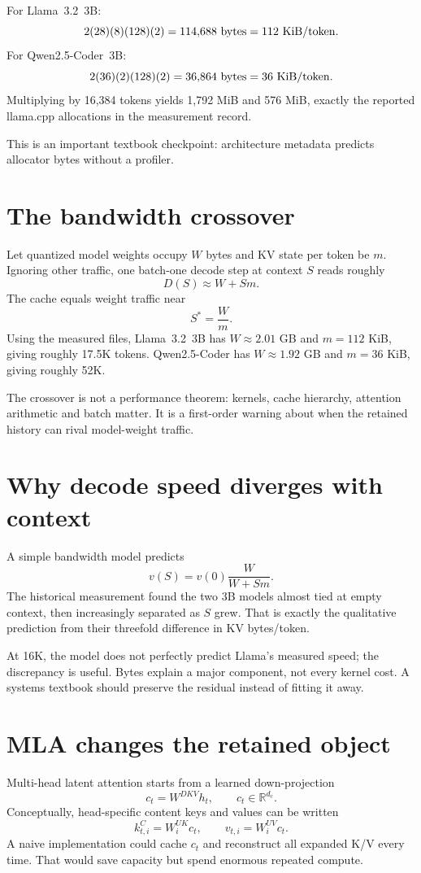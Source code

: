 For Llama~3.2~3B:
\[
2(28)(8)(128)(2)=114{,}688\ {\rm bytes}=112\ {\rm KiB/token}.
\]
For Qwen2.5-Coder~3B:
\[
2(36)(2)(128)(2)=36{,}864\ {\rm bytes}=36\ {\rm KiB/token}.
\]
Multiplying by 16,384 tokens yields 1,792 MiB and 576 MiB, exactly the reported
llama.cpp allocations in the measurement record.

This is an important textbook checkpoint: architecture metadata predicts allocator
bytes without a profiler.

\section{The bandwidth crossover}

Let quantized model weights occupy $W$ bytes and KV state per token be $m$. Ignoring
other traffic, one batch-one decode step at context $S$ reads roughly
\[
D(S)\approx W+Sm.
\]
The cache equals weight traffic near
\[
S^*=\frac{W}{m}.
\]
Using the measured files, Llama~3.2~3B has $W\approx2.01$ GB and
$m=112$ KiB, giving roughly 17.5K tokens. Qwen2.5-Coder has $W\approx1.92$ GB and
$m=36$ KiB, giving roughly 52K.

The crossover is not a performance theorem: kernels, cache hierarchy, attention
arithmetic and batch matter. It is a first-order warning about when the retained
history can rival model-weight traffic.

\section{Why decode speed diverges with context}

A simple bandwidth model predicts
\[
v(S)=v(0)\frac{W}{W+Sm}.
\]
The historical measurement found the two 3B models almost tied at empty context, then
increasingly separated as $S$ grew. That is exactly the qualitative prediction from
their threefold difference in KV bytes/token.

At 16K, the model does not perfectly predict Llama's measured speed; the discrepancy
is useful. Bytes explain a major component, not every kernel cost. A systems textbook
should preserve the residual instead of fitting it away.

\section{MLA changes the retained object}

Multi-head latent attention starts from a learned down-projection
\[
c_t=W^{DKV}h_t,\qquad c_t\in\mathbb{R}^{d_c}.
\]
Conceptually, head-specific content keys and values can be written
\[
k^C_{t,i}=W^{UK}_i c_t,\qquad
v_{t,i}=W^{UV}_i c_t.
\]
A naive implementation could cache $c_t$ and reconstruct all expanded K/V every time.
That would save capacity but spend enormous repeated compute.

